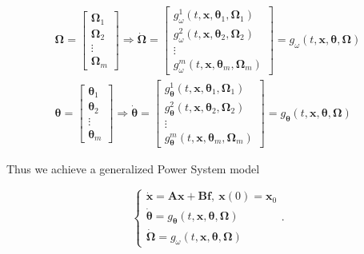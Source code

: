 \begin{gather}
	\boldsymbol{\Omega} = \left[\begin{array}{c} \boldsymbol{\Omega}_1 \\[3mm] \boldsymbol{\Omega}_2 \\[3mm] \vdots \\[3mm] \boldsymbol{\Omega}_{m} \end{array}\right] \Rightarrow \dot{\boldsymbol{\Omega}} = \left[\begin{array}{c} g_\omega^1\left(t,\mathbf{x},\boldsymbol{\theta}_1,\boldsymbol{\Omega}_1\right) \\[3mm] g_\omega^2\left(t,\mathbf{x},\boldsymbol{\theta}_2,\boldsymbol{\Omega}_2\right) \\[3mm] \vdots \\[3mm] g_\omega^m\left(t,\mathbf{x},\boldsymbol{\theta}_m,\boldsymbol{\Omega}_m\right) \end{array}\right] = g_\omega\left(t,\mathbf{x},\boldsymbol{\theta},\boldsymbol{\Omega}\right) \\[5mm]
%
	\boldsymbol{\theta} = \left[\begin{array}{c} \boldsymbol{\theta}_1 \\[3mm] \boldsymbol{\theta}_2 \\[3mm] \vdots \\[3mm] \boldsymbol{\theta}_{m} \end{array}\right] \Rightarrow \dot{\boldsymbol{\theta}} = \left[\begin{array}{c} g_{\boldsymbol{\theta}}^1\left(t,\mathbf{x},\boldsymbol{\theta}_1,\boldsymbol{\Omega}_1\right) \\[3mm] g_{\boldsymbol{\theta}}^2\left(t,\mathbf{x},\boldsymbol{\theta}_2,\boldsymbol{\Omega}_2\right) \\[3mm] \vdots \\[3mm] g_{\boldsymbol{\theta}}^m\left(t,\mathbf{x},\boldsymbol{\theta}_m,\boldsymbol{\Omega}_m\right) \end{array}\right] = g_{\boldsymbol{\theta}}\left(t,\mathbf{x},\boldsymbol{\theta},\boldsymbol{\Omega}\right)
\end{gather}

	Thus we achieve a generalized Power System model

\begin{equation}
	\left\{\begin{array}{l}
		\dot{\mathbf{x}} = \mathbf{Ax + Bf},\ \mathbf{x}\left(0\right) = \mathbf{x}_0\\[2mm]
		\dot{\boldsymbol{\theta}} = g_{\boldsymbol{\theta}}\left(t,\mathbf{x},\boldsymbol{\theta},\boldsymbol{\Omega}\right) \\[2mm]
		\dot{\boldsymbol{\Omega}} = g_\omega\left(t,\mathbf{x},\boldsymbol{\theta},\boldsymbol{\Omega}\right)
	\end{array}\right. .\label{eq:lemma_time_complex}
\end{equation}

